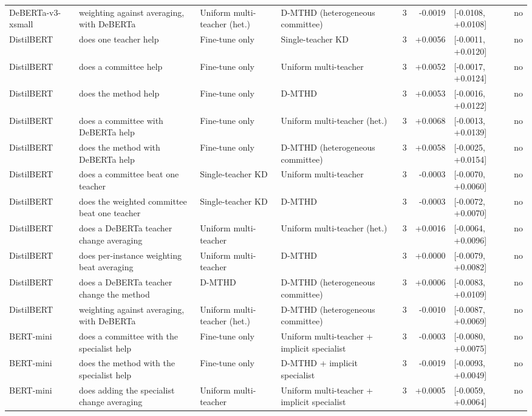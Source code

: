 \begin{table}[t]
\begin{tabular}{llllrrll}
DeBERTa-v3-xsmall & weighting against averaging, with DeBERTa & Uniform multi-teacher (het.) & D-MTHD (heterogeneous committee) & 3 & -0.0019 & [-0.0108, +0.0108] & no \\
DistilBERT & does one teacher help & Fine-tune only & Single-teacher KD & 3 & +0.0056 & [-0.0011, +0.0120] & no \\
DistilBERT & does a committee help & Fine-tune only & Uniform multi-teacher & 3 & +0.0052 & [-0.0017, +0.0124] & no \\
DistilBERT & does the method help & Fine-tune only & D-MTHD & 3 & +0.0053 & [-0.0016, +0.0122] & no \\
DistilBERT & does a committee with DeBERTa help & Fine-tune only & Uniform multi-teacher (het.) & 3 & +0.0068 & [-0.0013, +0.0139] & no \\
DistilBERT & does the method with DeBERTa help & Fine-tune only & D-MTHD (heterogeneous committee) & 3 & +0.0058 & [-0.0025, +0.0154] & no \\
DistilBERT & does a committee beat one teacher & Single-teacher KD & Uniform multi-teacher & 3 & -0.0003 & [-0.0070, +0.0060] & no \\
DistilBERT & does the weighted committee beat one teacher & Single-teacher KD & D-MTHD & 3 & -0.0003 & [-0.0072, +0.0070] & no \\
DistilBERT & does a DeBERTa teacher change averaging & Uniform multi-teacher & Uniform multi-teacher (het.) & 3 & +0.0016 & [-0.0064, +0.0096] & no \\
DistilBERT & does per-instance weighting beat averaging & Uniform multi-teacher & D-MTHD & 3 & +0.0000 & [-0.0079, +0.0082] & no \\
DistilBERT & does a DeBERTa teacher change the method & D-MTHD & D-MTHD (heterogeneous committee) & 3 & +0.0006 & [-0.0083, +0.0109] & no \\
DistilBERT & weighting against averaging, with DeBERTa & Uniform multi-teacher (het.) & D-MTHD (heterogeneous committee) & 3 & -0.0010 & [-0.0087, +0.0069] & no \\
BERT-mini & does a committee with the specialist help & Fine-tune only & Uniform multi-teacher + implicit specialist & 3 & -0.0003 & [-0.0080, +0.0075] & no \\
BERT-mini & does the method with the specialist help & Fine-tune only & D-MTHD + implicit specialist & 3 & -0.0019 & [-0.0093, +0.0049] & no \\
BERT-mini & does adding the specialist change averaging & Uniform multi-teacher & Uniform multi-teacher + implicit specialist & 3 & +0.0005 & [-0.0059, +0.0064] & no \\

\end{tabular}
\end{table}
